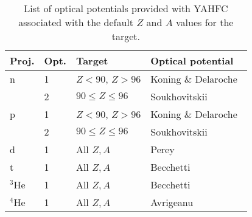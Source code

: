 \documentclass[
10pt,
showpacs,preprintnumbers,footinbib,
amsfonts,amsmath,amssymb,
aps,
prc,twocolumn,groupedaddress,superscriptaddress,
showkeys,
nofootinbib
]{revtex4-1}
\begin{document}
\begin{table}
\caption{List of optical potentials provided with YAHFC associated with the default $Z$ and $A$ values for the target.}
\begin{tabular}{| p{0.75cm} | p{0.75cm} | p{2.2cm} | p{4cm}|}
\hline
Proj. & Opt. & Target & Optical potential \\
\hline\hline
n & 1 & $ Z < 90 $, $Z >96$ & Koning \& Delaroche~\cite{Koning:2003}\\
  &  2 & $90 \le Z \le 96$ & Soukhovitskii~\cite{Soukhovitskii:2004} \\
\hline
p & 1 & $ Z < 90 $, $Z >96$&  Koning \& Delaroche~\cite{Koning:2003}\\
  &  2 & $90 \le Z \le 96$& Soukhovitskii~\cite{Soukhovitskii:2004} \\
\hline
d & 1 & All $Z,A$  &  Perey~\cite{Perey:1976}\\
\hline
t & 1 & All $Z,A$ & Becchetti~\cite{Perey:1976}\\
\hline
$^3$He & 1 & All $Z,A$  & Becchetti~\cite{Perey:1976}\\
\hline
$^4$He & 1 & All $Z,A$  & Avrigeanu~\cite{Avrigeanu:1994}\\
\hline
\end{tabular}
\label{tab:optical}
\end{table}
\end{document}
